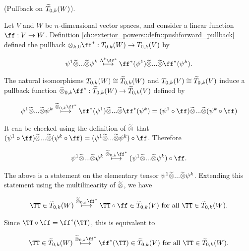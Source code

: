 \begin{deriv}
\label{ch::exterior_powers::deriv::pullback_on_tT0k}
    (Pullback on $\widetilde{T}_{0,k}(W)$).
    
    Let $V$ and $W$ be $n$-dimensional vector spaces, and consider a linear function $\ff:V \rightarrow W$. Definition \ref{ch::exterior_powers::defn::pushforward_pullback} defined the pullback $\otimes_{k, 0} \ff^*: T_{0,k}(W) \rightarrow T_{0,k}(V)$ by
    
    \begin{align*}
        \psi^1 \totimes ... \totimes \psi^k \overset{\Lambda^k \ff^*}{\longmapsto} \ff^*(\psi^1) \totimes ... \totimes \ff^*(\psi^k).
    \end{align*}
    
    The natural isomorphisms $T_{0,k}(W) \cong \widetilde{T}_{0,k}(W)$ and $T_{0,k}(V) \cong \widetilde{T}_{0,k}(V)$ induce a pullback function ${\totimes_{0,k} \ff^*:\tT_{0,k}(W) \rightarrow \tT_{0,k}(V)}$ defined by
    
    \begin{align*}
        \psi^1 \totimes ... \totimes \psi^k \overset{\totimes_{0,k} \ff^*}{\longmapsto} \ff^*(\psi^1) \totimes ... \totimes \ff^*(\psi^k) = (\psi^1 \circ \ff) \totimes ... \totimes (\psi^k \circ \ff)
    \end{align*}
    
    It can be checked using the definition of $\widetilde{\otimes}$ that $(\psi^1 \circ \ff) \totimes ... \totimes (\psi^k \circ \ff) = (\psi^1 \totimes ... \totimes \psi^k) \circ \ff$. Therefore
    
    \begin{align*}
        \psi^1 \totimes ... \totimes \psi^k \overset{\totimes_{0,k} \ff^*}{\longmapsto}
        (\psi^1 \totimes ... \totimes \psi^k) \circ \ff.
    \end{align*}
    
    The above is a statement on the elementary tensor $\psi^1 \widetilde{\otimes} ... \widetilde{\otimes} \psi^k$. Extending this statement using the multilinearity of $\widetilde{\otimes}$, we have
    
    \begin{align*}
        \TT \in \tT_{0,k}(W) \overset{\totimes_{0,k} \ff^*}{\longmapsto} \TT \circ \ff \in \tT_{0,k}(V) \text{ for all $\TT \in \tT_{0,k}(W)$}.
    \end{align*}
    
    Since $\TT \circ \ff = \ff^*(\TT)$, this is equivalent to
    
    \begin{align*}
        \TT \in \tT_{0,k}(W) \overset{\totimes_{0,k} \ff^*}{\longmapsto} \ff^*(\TT) \in \tT_{0,k}(V) \text{ for all $\TT \in \tT_{0,k}(W)$}.
    \end{align*}
    

\end{deriv}

